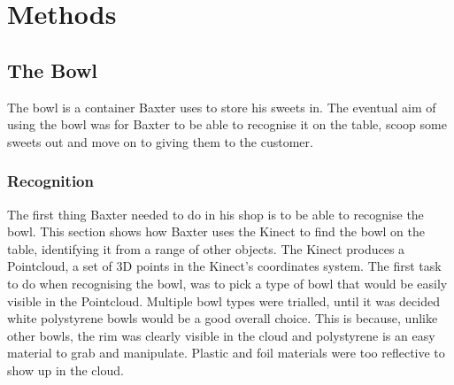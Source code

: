  

\chapter{Methods}
\label{chapter4}
\section{The Bowl}
The bowl is a container Baxter uses to store his sweets in. The eventual aim of using the bowl was for Baxter to be able to recognise it on the table, scoop some sweets out and move on to giving them to the customer.
\subsection{Recognition}
The first thing Baxter needed to do in his shop is to be able to recognise the bowl. This section shows how Baxter uses the Kinect to find the bowl on the table, identifying it from a range of other objects. The Kinect produces a Pointcloud, a set of 3D points in the Kinect's coordinates system. The first task to do when recognising the bowl, was to pick a type of bowl that would be easily visible in the Pointcloud. Multiple bowl types were trialled, until it was decided white polystyrene bowls would be a good overall choice. This is because, unlike other bowls, the rim was clearly visible in the cloud and polystyrene is an easy material to grab and manipulate. Plastic and foil materials were too reflective to show up in the cloud.
